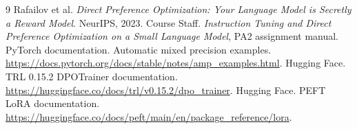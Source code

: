 \documentclass[10pt,a4paper]{article}
\begin{document}
\begingroup\footnotesize
\setlength{\parskip}{0pt}
\begin{thebibliography}{9}
\setlength{\itemsep}{0pt}
 Rafailov et al. \emph{Direct Preference Optimization: Your Language Model is Secretly a Reward Model}. NeurIPS, 2023.
 Course Staff. \emph{Instruction Tuning and Direct Preference Optimization on a Small Language Model}, PA2 assignment manual.
 PyTorch documentation. Automatic mixed precision examples. \url{https://docs.pytorch.org/docs/stable/notes/amp_examples.html}.
 Hugging Face. TRL 0.15.2 DPOTrainer documentation. \url{https://huggingface.co/docs/trl/v0.15.2/dpo_trainer}.
 Hugging Face. PEFT LoRA documentation. \url{https://huggingface.co/docs/peft/main/en/package_reference/lora}.
\end{thebibliography}
\endgroup
\end{document}
